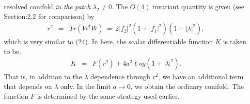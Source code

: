 \documentclass[a4paper,12pt]{article}
\begin{document}
resolved conifold {\it{in the patch ${\lambda}_2 \neq 0$}}. The $O(4)$  
invariant quantity is given (see Section:2.2 for comparison) by 
\begin{eqnarray}
r^2 &=& Tr(W^{\dagger}W)\ =\ 2| f_2|^2 (1+|f_1|^2)(1+| \lambda |^2),
\end{eqnarray}
which is very similar to (24).  
In here, the scalar differentiable 
function $K$ 
is taken to be,
\begin{eqnarray}
K &=& F(r^2) + 4a^2 \ell og (1+| \lambda |^2).
\end{eqnarray}
That is, in addition to the $\lambda $ dependence through $r^2$,  
we have an additional term that
depends on $\lambda$ only.  
In the limit $a\rightarrow 0$, we obtain the 
ordinary conifold. The function $F$ is determined by the same strategy used 
earlier. 

\vspace{0.5cm}
\end{document}
